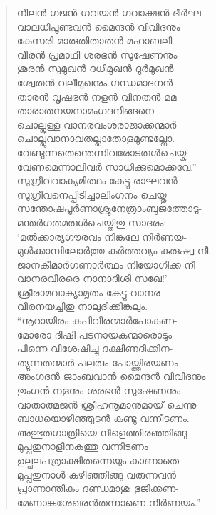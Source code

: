 \begin{verse}
നീലന്‍ ഗജന്‍ ഗവയന്‍ ഗവാക്ഷന്‍ ദീര്‍ഘ-\\
വാലധിപൂണ്ടവന്‍ മൈന്ദന്‍ വിവിദനും\\
കേസരി മാരുതിതാതന്‍ മഹാബലി\\
വീരന്‍ പ്രമാഥി ശരഭന്‍ സുഷേണനും\\
ശൂരന്‍ സുമുഖന്‍ ദധിമുഖന്‍ ദുര്‍മുഖന്‍\\
ശ്വേതന്‍ വലീമുഖനും ഗന്ധമാദനന്‍\\
താരന്‍ വൃഷഭന്‍ നളന്‍ വിനതന്‍ മമ\\
താരാതനയനാമംഗദനിങ്ങനെ\\
ചൊല്ലുള്ള വാനരവംശരാജാക്കന്മാര്‍\\
ചൊല്ലുവാനാവതല്ലാതോളമുണ്ടല്ലോ.\\
വേണ്ടുന്നതെന്തെന്നിവരോടരുള്‍ചെയ്ക\\
വേണമെന്നാലിവര്‍ സാധിക്കുമൊക്കവേ.”\\
സുഗ്രീവവാക്യമിത്ഥം കേട്ടു രാഘവന്‍\\
സുഗ്രീവനെപ്പിടിച്ചാലിംഗനം ചെയ്തു\\
സന്തോഷപൂര്‍ണാശ്രുനേത്രാംബുജത്തോടു-\\
മന്തര്‍ഗതമരുള്‍ചെയ്തിതു സാദരം:\\
‘മല്‍ക്കാര്യഗൗരവം നിങ്കലേ നിര്‍ണയ-\\
മുള്‍ക്കാമ്പിലോര്‍ത്തു കര്‍ത്തവ്യം കുരുഷ്വ നീ.\\
ജാനകീമാര്‍ഗണാര്‍ത്ഥം നിയോഗിക്ക നീ\\
വാനരവീരരെ നാനാദിശി സഖേ!’\\
ശ്രീരാമവാക്യാമൃതം കേട്ടു വാനര-\\
വീരനയച്ചിതു നാലുദിക്കിങ്കലും.\\
“നൂറായിരം കപിവീരന്മാര്‍പോകണ-\\
മോരോ ദിഷി പടനായകന്മാരൊടും\\
പിന്നെ വിശേഷിച്ചു ദക്ഷിണദിക്കിന-\\
ത്യുന്നതന്മാര്‍ പലരും പോയ്ത്തിരയണം\\
അംഗദന്‍ ജാംബവാന്‍ മൈന്ദന്‍ വിവിദനും\\
തുംഗന്‍ നളനും ശരഭന്‍ സുഷേണനും\\
വാതാത്മജന്‍ ശ്രീഹനൂമാനുമായ് ചെന്നു\\
ബാധയൊഴിഞ്ഞുടന്‍ കണ്ടു വന്നീടണം.\\
അത്ഭുതഗാത്രിയെ നീളെത്തിരഞ്ഞിങ്ങു\\
മുപ്പതുനാളിനകത്തു വന്നീടണം\\
ഉല്പലപത്രാക്ഷിതന്നെയും കാണാതെ\\
മുപ്പതുനാള്‍ കഴിഞ്ഞിങ്ങു വരുന്നവന്‍\\
പ്രാണാന്തികം ദണ്ഡമാശു ഭുജിക്കണ-\\
മേണാങ്കശേഖരന്‍തന്നാണെ നിര്‍ണയം.”\\

\end{verse}
